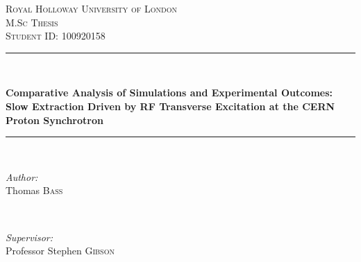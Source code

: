 \begin{titlepage}

\newcommand{\HRule}{\rule{\linewidth}{0.5mm}} %
\center %
 

\textsc{\LARGE Royal Holloway University of London}\\[1.5cm] %
\textsc{\Large M.Sc Thesis}\\[0.5cm] %
\textsc{\large Student ID: 100920158}\\[0.5cm] %


\HRule \\[0.4cm]
\begin{spacing}{2}
{ \huge \bfseries Comparative Analysis of Simulations and Experimental Outcomes: Slow Extraction Driven by RF Transverse Excitation at the CERN Proton Synchrotron}\\[0.4cm] %
\end{spacing}
\HRule \\[0.4cm]

 

\begin{minipage}{0.4\textwidth}
\begin{flushleft} \large
\emph{Author:}\\
Thomas \textsc{Bass} %
\end{flushleft}
\end{minipage}
~
\begin{minipage}{0.4\textwidth}
\begin{flushright} \large
\emph{Supervisor:} \\
Professor Stephen \textsc{Gibson} %
\end{flushright}
\end{minipage}\\[2cm]


\end{titlepage}
